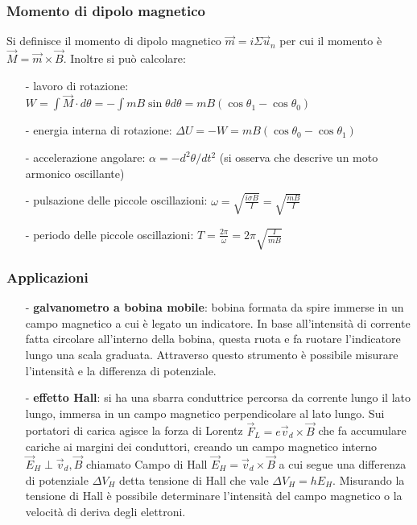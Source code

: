 \documentclass[a4paper]{article}
\newcommand\un{\vec{u}_n}
\begin{document}
\subsubsection*{Momento di dipolo magnetico}
Si definisce il momento di dipolo magnetico \(\vec{m} = i \Sigma \un\) per cui il momento è \(\vec{M} = \vec{m} \times \vec{B}\).
Inoltre si può calcolare:
\begin{itemize}[topsep=3pt, itemsep=0pt]
	\item[-] lavoro di rotazione: \(W = \int \vec{M} \cdot d\theta = - \int m B \sin \theta d\theta = mB (\cos \theta_1 - \cos \theta_0)\)
	\item[-] energia interna di rotazione: \(\Delta U = -W = mB (\cos \theta_0 - \cos \theta_1)\)
	\item[-] accelerazione angolare: \(\alpha = - d^2 \theta / dt^2\) (si osserva che descrive un moto armonico oscillante)
	\item[-] pulsazione delle piccole oscillazioni: \(\omega = \sqrt{\frac{i \sigma B}{I}} = \sqrt{\frac{mB}{I}}\)
	\item[-] periodo delle piccole oscillazioni: \(T = \frac{2 \pi}{\omega} = 2 \pi \sqrt{\frac{I}{mB}}\)
\end{itemize} 

\subsubsection*{Applicazioni}
\begin{itemize}[topsep=3pt, itemsep=0pt]
	\item[-] \textbf{galvanometro a bobina mobile}: bobina formata da spire immerse in un campo magnetico a cui è legato un
	indicatore. In base all'intensità di corrente fatta circolare all'interno della bobina, questa ruota e fa ruotare l'indicatore
	lungo una scala graduata. Attraverso questo strumento è possibile misurare l'intensità e la differenza di potenziale.
	\item[-] \textbf{effetto Hall}: si ha una sbarra conduttrice percorsa da corrente lungo il lato lungo, immersa in un campo
	magnetico perpendicolare al lato lungo. Sui portatori di carica agisce la forza di Lorentz \(\vec{F}_L = e \vec{v}_d \times \vec{B}\)
	che fa accumulare cariche ai margini dei conduttori, creando un campo magnetico interno \(\vec{E}_H \perp \vec{v}_d, \vec{B}\)
	chiamato Campo di Hall \(\vec{E}_H = \vec{v}_d \times \vec{B}\) a cui segue una differenza di potenziale
	\(\Delta V_H\) detta tensione di Hall che vale \(\Delta V_H = h E_H\). Misurando la tensione di Hall è possibile determinare
	l'intensità del campo magnetico o la velocità di deriva degli elettroni.
\end{itemize}
\end{document}
